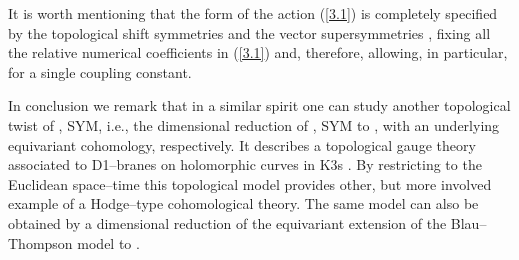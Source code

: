 \documentclass[a4paper,11pt]{article}
\begin{document}
It is worth mentioning that the form of the action (\ref{3.1}) is completely 
specified by the topological shift symmetries \coordHE{} and the 
vector supersymmetries \coordHE{}, fixing all the 
relative numerical coefficients in (\ref{3.1}) and, therefore, allowing, 
in particular, for a single coupling constant.

In conclusion we remark that in a similar spirit 
one can study another topological twist of \coordHE{}, \coordHE{} SYM, i.e., 
the dimensional reduction of \coordHE{}, \coordHE{} SYM to \coordHE{}, with an 
underlying \coordHE{} equivariant cohomology, respectively. 
It describes a topological gauge theory associated to D1--branes on 
holomorphic curves in K3s \cite{16}. By restricting to the Euclidean 
space--time this topological model provides other, but more 
involved example of a Hodge--type cohomological theory. The same model
can also be obtained by a dimensional reduction of the \coordHE{}
equivariant extension of the Blau--Thompson model \cite{19} to \coordHE{}. 

\end{document}
